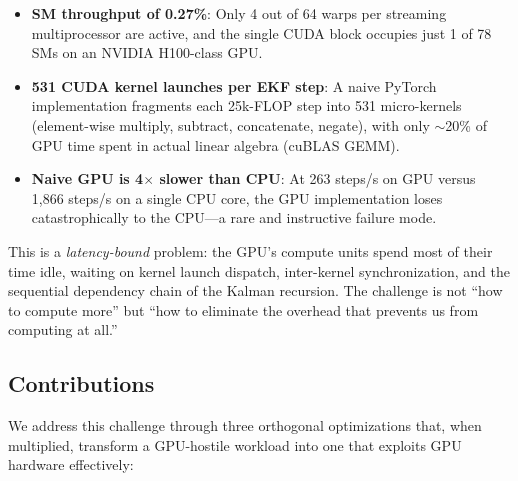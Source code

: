 \documentclass[pdflatex,sn-mathphys-num]{sn-jnl}%
\theoremstyle{thmstyleone}%
\theoremstyle{thmstyletwo}%
\theoremstyle{thmstylethree}%
\begin{document}
\begin{itemize}
\item \textbf{SM throughput of 0.27\%}: Only 4 out of 64 warps per streaming multiprocessor are active, and the single CUDA block occupies just 1 of 78 SMs on an NVIDIA H100-class GPU.
\item \textbf{531 CUDA kernel launches per EKF step}: A naive PyTorch implementation fragments each 25k-FLOP step into 531 micro-kernels (element-wise multiply, subtract, concatenate, negate), with only $\sim$20\% of GPU time spent in actual linear algebra (cuBLAS GEMM).
\item \textbf{Naive GPU is 4$\times$ slower than CPU}: At 263 steps/s on GPU versus 1,866 steps/s on a single CPU core, the GPU implementation loses catastrophically to the CPU---a rare and instructive failure mode.
\end{itemize}

This is a \textit{latency-bound} problem: the GPU's compute units spend most of their time idle, waiting on kernel launch dispatch, inter-kernel synchronization, and the sequential dependency chain of the Kalman recursion. The challenge is not ``how to compute more'' but ``how to eliminate the overhead that prevents us from computing at all.''

\subsection{Contributions}\label{subsec:contributions}

We address this challenge through three orthogonal optimizations that, when multiplied, transform a GPU-hostile workload into one that exploits GPU hardware effectively:
\end{document}
